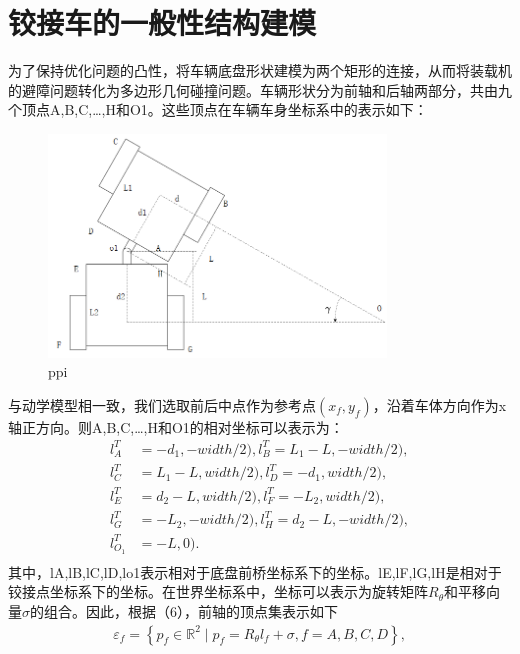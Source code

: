 \documentclass[master,academic]{ysuthesis} %
\begin{document}
	\section{铰接车的一般性结构建模}
	为了保持优化问题的凸性，将车辆底盘形状建模为两个矩形的连接，从而将装载机的避障问题转化为多边形几何碰撞问题。车辆形状分为前轴和后轴两部分，共由九个顶点A,B,C,…,H和O1。这些顶点在车辆车身坐标系中的表示如下：
	\begin{figure}[!ht]
		\centering
		\includegraphics[width=0.8\textwidth]{ppi.png}
		\caption{ppi}
		\label{fig:ppi}
	\end{figure}
	与动学模型相一致，我们选取前后中点作为参考点$(x_f,y_f)$，沿着车体方向作为x轴正方向。则A,B,C,…,H和O1的相对坐标可以表示为：
	\begin{equation}
		\begin{aligned}
			l_{A}^{T}&= -d_1,-width/2 ) ,l_{B}^{T}= L_1-L,-width/2 ) ,\\
			l_{C}^{T}&= L_1-L,width/2 ) ,l_{D}^{T}= -d_1,width/2 ) ,\\
			l_{E}^{T}&= d_2-L,width/2 ) ,l_{F}^{T}= -L_2,width/2 ) ,\\
			l_{G}^{T}&= -L_2,-width/2 ) ,l_{H}^{T}= d_2-L,-width/2 ) ,\\
			l_{O_1}^{T}&= -L,0 ) .\\
		\end{aligned}
	\end{equation}
	其中，lA,lB,lC,lD,lo1表示相对于底盘前桥坐标系下的坐标。lE,lF,lG,lH是相对于铰接点坐标系下的坐标。在世界坐标系中，坐标可以表示为旋转矩阵$R_\theta$和平移向量$\sigma$的组合。因此，根据（6），前轴的顶点集表示如下
	\begin{equation}
	\begin{aligned}
		\varepsilon_f = \left\{ p_f \in \mathbb{R}^2 \mid p_f=R_\theta l_f+\sigma,  f = A,B,C,D \right\},
	\end{aligned} 
	\end{equation}
	
\end{document}
